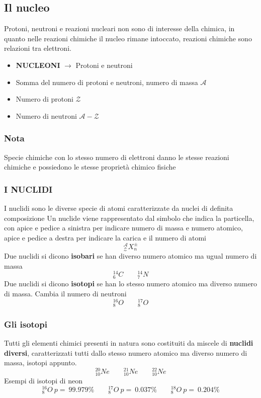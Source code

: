 \documentclass{article}
\begin{document}
\subsection{Il nucleo}
Protoni, neutroni e reazioni nucleari non sono di interesse della chimica, in quanto nelle reazioni chimiche il nucleo rimane intoccato, reazioni chimiche sono relazioni tra elettroni. 
\begin{itemize}
    \item \textbf{NUCLEONI} $\rightarrow$ Protoni e neutroni
    \item Somma del numero di protoni e neutroni, numero di massa $\mathcal{A}$
    \item Numero di protoni $\mathcal{Z}$
    \item Numero di neutroni $\mathcal{A-Z}$
\end{itemize}
\subsubsection*{Nota}
Specie chimiche con lo stesso numero di elettroni danno le stesse reazioni chimiche e possiedono le stesse proprietà chimico fisiche
\subsubsection{I NUCLIDI}
I nuclidi sono le diverse specie di atomi caratterizzate da nuclei di definita composizione Un nuclide viene rappresentato dal simbolo che indica la particella, con apice e pedice a sinistra per indicare numero di massa e numero atomico, apice e pedice a destra per indicare la carica e il numero di atomi
\[
^\mathcal{A}_\mathcal{Z}X^\pm _n
\]
Due nuclidi si dicono \textbf{isobari} se han diverso numero atomico ma ugual numero di massa
\[
^{14}_6C \qquad  ^{14}_7N
\]
Due nuclidi si dicono \textbf{isotopi} se han lo stesso numero atomico ma diverso numero di massa. Cambia il numero di neutroni
\[
^{16}_8O \qquad ^{17}_8O
\]
\subsubsection{Gli isotopi}
Tutti gli elementi chimici presenti in natura sono costituiti da miscele di \textbf{nuclidi diversi},
caratterizzati tutti dallo stesso numero atomico ma diverso numero di massa, isotopi appunto.\\
\[
^{20}_{10}Ne \qquad ^{21}_{10}Ne \qquad^{22}_{10}Ne 
\]
Esempi di isotopi di neon
\begin{equation}\label{abbondanza_ox}
^{16}_{8}O \ p= \ 99.979\% \qquad ^{17}_{8}O \ p= \ 0.037\%  \qquad^{18}_{8}O \ p= \ 0.204\%    
\end{equation}
\end{document}
